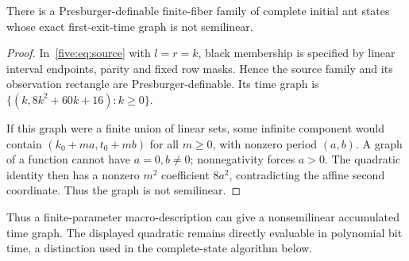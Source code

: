 \begin{corollary}\label{five:cor:nonsemi}
There is a Presburger-definable finite-fiber family of complete initial ant
states whose exact first-exit-time graph is not semilinear.
\end{corollary}
\begin{proof}
In~\eqref{five:eq:source} with $l=r=k$, black membership is specified by linear
interval endpoints, parity and fixed row masks. Hence the source family and
its observation rectangle are Presburger-definable. Its time graph is
$\{(k,8k^2+60k+16):k\ge0\}$.

If this graph were a finite union of linear sets, some infinite component
would contain $(k_0+ma,t_0+mb)$ for all $m\ge0$, with nonzero period $(a,b)$.
A graph of a function cannot have $a=0,b\ne0$; nonnegativity forces $a>0$.
The quadratic identity then has a nonzero $m^2$ coefficient $8a^2$, contradicting
the affine second coordinate. Thus the graph is not semilinear.
\end{proof}

Thus a finite-parameter macro-description can give a nonsemilinear accumulated
time graph. The displayed quadratic remains directly evaluable in polynomial
bit time, a distinction used in the complete-state algorithm below.

